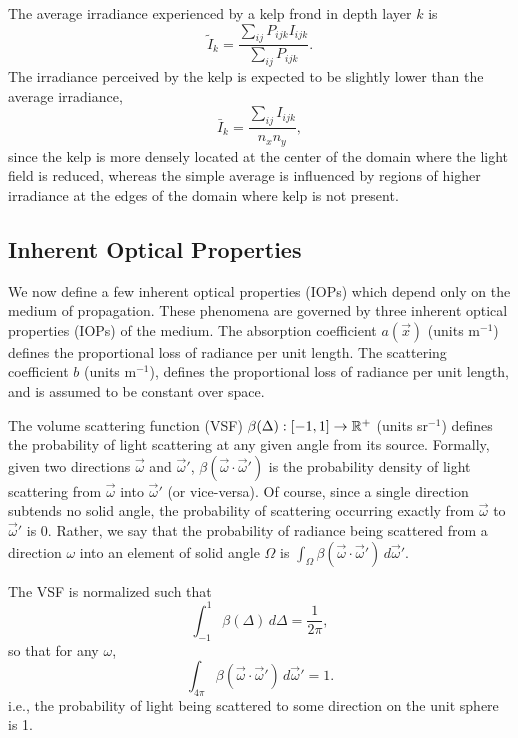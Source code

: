 The average irradiance experienced by a kelp frond in depth layer $k$ is
\newcommand{\Iperk}{\tilde{I}_k}
\begin{equation*}
   \Iperk = \frac{\sum_{ij}P_{ijk}I_{ijk}}{\sum_{ij}P_{ijk}}.
\end{equation*}
The irradiance perceived by the kelp is expected to be slightly lower than the average irradiance,
\begin{equation*}
  \bar{I}_k = \frac{\sum_{ij}I_{ijk}}{n_x n_y},
\end{equation*}
since the kelp is more densely located at the center of the domain where the light field is reduced,
whereas the simple average is influenced by regions of higher irradiance at the edges of the domain where kelp is not present.

\subsection{Inherent Optical Properties}
We now define a few inherent optical properties (IOPs) which depend only on the medium of propagation.
These phenomena are governed by three inherent optical properties (IOPs) of the
medium.
The absorption coefficient $a(\vec{x})$ (units m$^{-1}$) defines the
proportional loss of radiance per unit length.
The scattering coefficient $b$ (units m$^{-1}$), defines the proportional loss
of radiance per unit length, and is assumed to be constant over space.

The volume scattering function (VSF) $\beta(\Delta): [-1, 1] \to \mathbb{R}^+$ (units sr$^{-1}$) defines the probability of light scattering at any given angle from its source.
Formally, given two directions $\vec{\omega}$ and $\vec{\omega}'$, $\beta(\vec{\omega} \cdot \vec{\omega}')$ is the probability density of light scattering from $\vec{\omega}$ into $\vec{\omega}'$ (or vice-versa).
Of course, since a single direction subtends no solid angle, the probability of scattering occurring exactly from $\vec{\omega}$ to $\vec{\omega}'$ is 0.
Rather, we say that the probability of radiance being scattered from a direction $\omega$ into an element of solid angle $\Omega$ is $\int_\Omega \beta(\vec{\omega} \cdot \vec{\omega}')\, d\vec{\omega}'$.

The VSF is normalized such that
\begin{equation*}
  \int_{-1}^1\beta(\Delta)\, d\Delta=\frac{1}{2\pi},
\end{equation*}
so that for any $\omega$,
\begin{equation*}
  \int_{4\pi}\beta(\vec{\omega}\cdot\vec{\omega}')\, d\vec{\omega}' = 1.
\end{equation*}
i.e., the probability of light being scattered to some direction on the unit sphere is 1.


